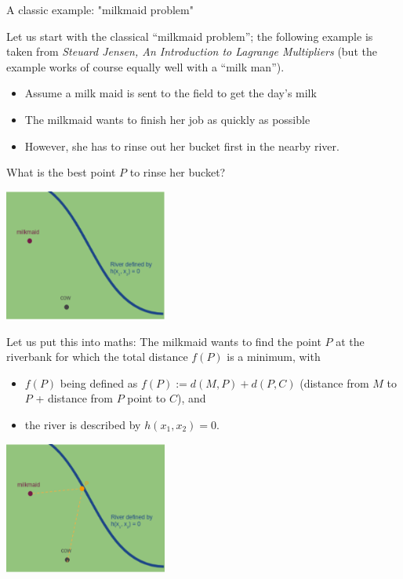 \begin{vbframe}{A classic example: "milkmaid problem"}

Let us start with the classical \enquote{milkmaid problem}; the following example is taken from \textit{Steuard Jensen, An Introduction to Lagrange Multipliers} (but the example works of course equally well with a \enquote{milk man}). 

\begin{itemize}
	\item Assume a milk maid is sent to the field to get the day's milk
	\item The milkmaid wants to finish her job as quickly as possible
	\item However, she has to rinse out her bucket first in the nearby river. 
\end{itemize}

What is the best point $P$ to rinse her bucket? 

\begin{center}
	\includegraphics[width = 0.4\textwidth]{figure_man/milkmaid1.png}
\end{center}

\framebreak 

Let us put this into maths: The milkmaid wants to find the point $P$ at the riverbank for which the total distance $f(P)$ is a minimum, with

\begin{itemize} 
\item $f(P)$ being defined as $f(P) := d(M, P) + d(P, C)$ 
(distance from $M$ to $P$ + distance from $P$ point to $C$), and
\item the river is described by $h(x_1, x_2) = 0$. 
\end{itemize}

\begin{center}
	\includegraphics[width = 0.4\textwidth]{figure_man/milkmaid2.png}
\end{center}



\end{vbframe}
